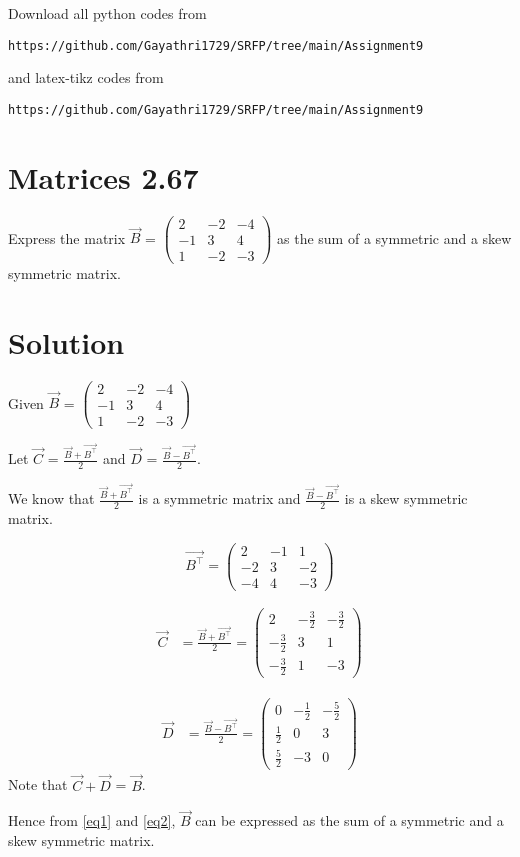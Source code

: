 \documentclass[journal,12pt,twocolumn]{IEEEtran}
\begin{document}
   Download all python codes from 
\begin{lstlisting}
https://github.com/Gayathri1729/SRFP/tree/main/Assignment9
\end{lstlisting}
%
and latex-tikz codes from 
%
\begin{lstlisting}
https://github.com/Gayathri1729/SRFP/tree/main/Assignment9
\end{lstlisting}
%
\section{Matrices 2.67}
Express the matrix $\vec{B}$ = $
\begin{pmatrix} 
2 & -2 & -4 \\  -1 & 3 & 4 \\ 1&-2&-3
\end{pmatrix}$
 as the sum of a symmetric and a skew symmetric matrix.
\section{Solution}
Given $\vec{B}$ = $
\begin{pmatrix} 
2 & -2 & -4 \\  -1 & 3 & 4 \\ 1&-2&-3
\end{pmatrix}$

Let $\vec{C}$ = $\frac{\vec{B}+\vec{B^\top}}{2}$ and $\vec{D}$ = $\frac{\vec{B}-\vec{B^\top}}{2}$.


We know that $\frac{\vec{B}+\vec{B^\top}}{2}$ is a symmetric matrix and $\frac{\vec{B}-\vec{B^\top}}{2}$ is a skew symmetric matrix.

\begin{equation}
\vec{B^\top} = 
\begin{pmatrix} 
2 & -1 & 1 \\ -2 & 3 & -2 \\ -4 & 4 & -3
\end{pmatrix} 
\end{equation} 

\begin{align}
  \vec{C} &= \frac{\vec{B}+\vec{B^\top}}{2} = \begin{pmatrix} 
2 & -\frac{3}{2} & -\frac{3}{2} \\  -\frac{3}{2} & 3 & 1 \\ -\frac{3}{2}&1&-3
\end{pmatrix} \label{eq1}
\end{align}


\begin{align}
\vec{D} &=\frac{\vec{B} - \vec{B^\top}}{2} =
\begin{pmatrix} 
0 & -\frac{1}{2} & -\frac{5}{2} \\  \frac{1}{2} & 0 & 3 \\ \frac{5}{2}&-3&0
\end{pmatrix} \label{eq2}
\end{align}
Note that $\vec{C} + \vec{D}$ = $\vec{B}$.

Hence from \eqref{eq1} and \eqref{eq2}, $\vec{B}$ can be expressed as the sum of a symmetric and a skew symmetric matrix.
\end{document}
